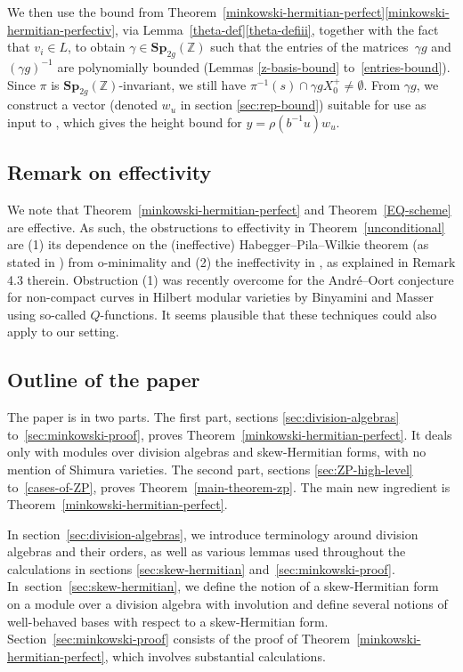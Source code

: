 \documentclass[JEP,XML,SOM,Unicode,NoFloatCountersInSection]{cedram}
\newcommand{\bZ}{\mathbb{Z}}
\newcommand{\gSp}{\mathbf{Sp}}
\begin{document}
We then use the bound from Theorem~\ref{minkowski-hermitian-perfect}\eqref{minkowski-hermitian-perfectiv}, via Lemma~\ref{theta-def}\eqref{theta-defiii}, together with the fact that $v_i \in L$, to obtain $\gamma \in \gSp_{2g}(\bZ)$ such that the entries of the matrices~$\gamma g$ and $(\gamma g)^{-1}$ are polynomially bounded (Lemmas \ref{z-basis-bound} to~\ref{entries-bound}).
Since $\pi$ is $\gSp_{2g}(\bZ)$-invariant, we still have $\pi^{-1}(s) \cap \gamma gX_0^+ \neq \emptyset$.
From $\gamma g$, we construct a vector (denoted $w_u$ in section \ref{sec:rep-bound}) suitable for use as input to \cite[Th.\,1.2]{QRTUI}, which gives the height bound for $y = \rho(b^{-1}u)w_u$.

\subsection{Remark on effectivity}

We note that Theorem~\ref{minkowski-hermitian-perfect} and Theorem~\ref{EQ-scheme} are effective. As such, the obstructions to effectivity in Theorem~\ref{unconditional} are (1) its dependence on the (ineffective) Habegger--Pila--Wilkie theorem (as stated in \cite[Th.\,9.1]{DR18}) from o-minimality and (2) the ineffectivity in \cite{QRTUI}, as explained in Remark 4.3 therein. Obstruction (1) was recently overcome for the André--Oort conjecture for non-compact curves in Hilbert modular varieties by Binyamini and Masser \cite{BM:AO} using so-called $Q$-functions. It seems plausible that these techniques could also apply to our setting.

\subsection{Outline of the paper}

The paper is in two parts.
The first part, sections \ref{sec:division-algebras} to~\ref{sec:minkowski-proof}, proves Theorem~\ref{minkowski-hermitian-perfect}. It deals only with modules over division algebras and skew-Hermitian forms, with no mention of Shimura varieties.
The second part, sections \ref{sec:ZP-high-level} to~\ref{cases-of-ZP}, proves Theorem~\ref{main-theorem-zp}. The main new ingredient is Theorem~\ref{minkowski-hermitian-perfect}.

In section~\ref{sec:division-algebras}, we introduce terminology around division algebras and their orders, as well as various lemmas used throughout the calculations in sections \ref{sec:skew-hermitian} and~\ref{sec:minkowski-proof}.
In~section~\ref{sec:skew-hermitian}, we define the notion of a skew-Hermitian form on a module over a division algebra with involution and define several notions of well-behaved bases with respect to a skew-Hermitian form.
Section~\ref{sec:minkowski-proof} consists of the proof of Theorem~\ref{minkowski-hermitian-perfect}, which involves substantial calculations.
\end{document}
